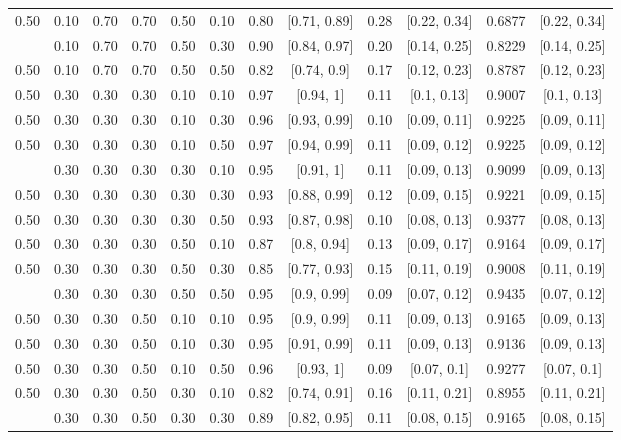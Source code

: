 \documentclass[
  11pt,
]{article}
\begin{document}
\begin{landscape}
\begin{ThreePartTable}
\begin{longtable}[t]{cccccccccccc}
0.50 & 0.10 & 0.70 & 0.70 & 0.50 & 0.10 & 0.80 & {}[0.71, 0.89] & 0.28 & {}[0.22, 0.34] & 0.6877 & {}[0.22, 0.34]\\
\addlinespace
0.50 & 0.10 & 0.70 & 0.70 & 0.50 & 0.30 & 0.90 & {}[0.84, 0.97] & 0.20 & {}[0.14, 0.25] & 0.8229 & {}[0.14, 0.25]\\
0.50 & 0.10 & 0.70 & 0.70 & 0.50 & 0.50 & 0.82 & {}[0.74, 0.9] & 0.17 & {}[0.12, 0.23] & 0.8787 & {}[0.12, 0.23]\\
0.50 & 0.30 & 0.30 & 0.30 & 0.10 & 0.10 & 0.97 & {}[0.94, 1] & 0.11 & {}[0.1, 0.13] & 0.9007 & {}[0.1, 0.13]\\
0.50 & 0.30 & 0.30 & 0.30 & 0.10 & 0.30 & 0.96 & {}[0.93, 0.99] & 0.10 & {}[0.09, 0.11] & 0.9225 & {}[0.09, 0.11]\\
0.50 & 0.30 & 0.30 & 0.30 & 0.10 & 0.50 & 0.97 & {}[0.94, 0.99] & 0.11 & {}[0.09, 0.12] & 0.9225 & {}[0.09, 0.12]\\
\addlinespace
0.50 & 0.30 & 0.30 & 0.30 & 0.30 & 0.10 & 0.95 & {}[0.91, 1] & 0.11 & {}[0.09, 0.13] & 0.9099 & {}[0.09, 0.13]\\
0.50 & 0.30 & 0.30 & 0.30 & 0.30 & 0.30 & 0.93 & {}[0.88, 0.99] & 0.12 & {}[0.09, 0.15] & 0.9221 & {}[0.09, 0.15]\\
0.50 & 0.30 & 0.30 & 0.30 & 0.30 & 0.50 & 0.93 & {}[0.87, 0.98] & 0.10 & {}[0.08, 0.13] & 0.9377 & {}[0.08, 0.13]\\
0.50 & 0.30 & 0.30 & 0.30 & 0.50 & 0.10 & 0.87 & {}[0.8, 0.94] & 0.13 & {}[0.09, 0.17] & 0.9164 & {}[0.09, 0.17]\\
0.50 & 0.30 & 0.30 & 0.30 & 0.50 & 0.30 & 0.85 & {}[0.77, 0.93] & 0.15 & {}[0.11, 0.19] & 0.9008 & {}[0.11, 0.19]\\
\addlinespace
0.50 & 0.30 & 0.30 & 0.30 & 0.50 & 0.50 & 0.95 & {}[0.9, 0.99] & 0.09 & {}[0.07, 0.12] & 0.9435 & {}[0.07, 0.12]\\
0.50 & 0.30 & 0.30 & 0.50 & 0.10 & 0.10 & 0.95 & {}[0.9, 0.99] & 0.11 & {}[0.09, 0.13] & 0.9165 & {}[0.09, 0.13]\\
0.50 & 0.30 & 0.30 & 0.50 & 0.10 & 0.30 & 0.95 & {}[0.91, 0.99] & 0.11 & {}[0.09, 0.13] & 0.9136 & {}[0.09, 0.13]\\
0.50 & 0.30 & 0.30 & 0.50 & 0.10 & 0.50 & 0.96 & {}[0.93, 1] & 0.09 & {}[0.07, 0.1] & 0.9277 & {}[0.07, 0.1]\\
0.50 & 0.30 & 0.30 & 0.50 & 0.30 & 0.10 & 0.82 & {}[0.74, 0.91] & 0.16 & {}[0.11, 0.21] & 0.8955 & {}[0.11, 0.21]\\
\addlinespace
0.50 & 0.30 & 0.30 & 0.50 & 0.30 & 0.30 & 0.89 & {}[0.82, 0.95] & 0.11 & {}[0.08, 0.15] & 0.9165 & {}[0.08, 0.15]\\

\end{longtable}
\end{ThreePartTable}
\end{landscape}
\end{document}
